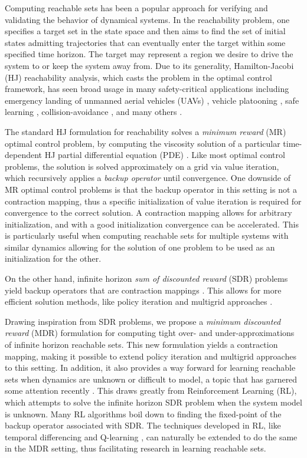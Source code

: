 
Computing reachable sets has been a popular approach for verifying and validating the behavior of dynamical systems. In the reachability problem, one specifies a target set in the state space and then aims to find the set of initial states admitting trajectories that can eventually enter the target within some specified time horizon. The target may represent a region we desire to drive the system to or keep the system away from. Due to its generality, Hamilton-Jacobi (HJ) reachability analysis, which casts the problem in the optimal control framework, has seen broad usage in many safety-critical applications including emergency landing of unmanned aerial vehicles (UAVs) \cite{Ding2016}, vehicle platooning \cite{Chen2015a}, safe learning \cite{Akametalu2014, Gillula2012}, collision-avoidance \cite{Hoffmann2008, Mitchell2005}, and many others \cite{Ding2011a, Huang2011}.


The standard HJ formulation for reachability solves a \emph{minimum reward} (MR) optimal control problem, by computing the viscosity solution of a particular time-dependent HJ partial differential equation (PDE) \cite{Mitchell2005}. Like most optimal control problems, the solution is solved approximately on a grid via value iteration, which recursively applies a \emph{backup operator} until convergence. One downside of MR optimal control problems is that the backup operator in this setting is not a contraction mapping, thus a specific initialization of value iteration is required for convergence to the correct solution. A contraction mapping allows for arbitrary initialization, and with a good initialization convergence can be accelerated. This is particularly useful when computing reachable sets for multiple systems with similar dynamics allowing for the solution of one problem to be used as an initialization for the other.

On the other hand, infinite horizon \emph{sum of discounted reward} (SDR) problems yield backup operators that are contraction mappings \cite{Bertsekas1995}. This allows for more efficient solution methods, like policy iteration \cite{Howard1964, Puterman1979} and multigrid approaches \cite{Alla2015, Chow1991}.   
 
Drawing inspiration from SDR problems, we propose a \emph{minimum discounted reward} (MDR) formulation for computing tight over- and under-approximations of infinite horizon reachable sets. This new formulation yields a contraction mapping, making it possible to extend policy iteration and multigrid approaches to this setting. In addition, it also provides a way forward for learning reachable sets when dynamics are unknown or difficult to model, a topic that has garnered some attention recently \cite{Akametalu2015,Djeridane2006}. This draws greatly from Reinforcement Learning (RL), which attempts to solve the infinite horizon SDR problem when the system model is unknown. Many RL algorithms boil down to finding the fixed-point of the backup operator associated with SDR. The techniques developed in RL, like temporal differencing \cite{Sutton1988} and Q-learning \cite{Watkins1992}, can naturally be extended to do the same in the MDR setting, thus facilitating research in learning reachable sets.

